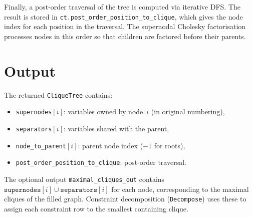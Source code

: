 \documentclass[11pt]{article}
\begin{document}
Finally, a post-order traversal of the tree is computed via iterative DFS.
The result is stored in
\texttt{ct.post\_order\_position\_to\_clique}, which gives the node index
for each position in the traversal.  The supernodal Cholesky factorisation
processes nodes in this order so that children are factored before their
parents.

\section{Output}

The returned \texttt{CliqueTree} contains:
\begin{itemize}
  \item \texttt{supernodes}$[i]$: variables owned by node~$i$ (in
    original numbering),
  \item \texttt{separators}$[i]$: variables shared with the parent,
  \item \texttt{node\_to\_parent}$[i]$: parent node index ($-1$ for
    roots),
  \item \texttt{post\_order\_position\_to\_clique}: post-order traversal.
\end{itemize}

The optional output \texttt{maximal\_cliques\_out} contains
$\texttt{supernodes}[i] \cup \texttt{separators}[i]$ for each node,
corresponding to the maximal cliques of the filled graph.  Constraint
decomposition (\texttt{Decompose}) uses these to assign each constraint
row to the smallest containing clique.
\end{document}
